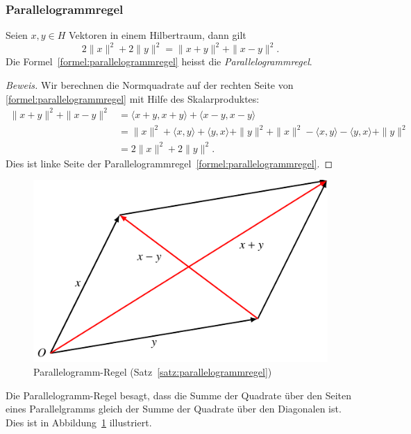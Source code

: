 \subsubsection{Parallelogrammregel}
\begin{satz}
\label{satz:parallelogrammregel}
Seien $x,y\in H$ Vektoren in einem Hilbertraum, dann gilt
\begin{equation}
2\|x\|^2 + 2\|y\|^2
=
\| x+y\|^2 + \|x-y\|^2.
\label{formel:parallelogrammregel}
\end{equation}
Die Formel~\eqref{formel:parallelogrammregel} heisst die
{\em Parallelogrammregel}.
\end{satz}

\begin{proof}[Beweis]
Wir berechnen die Normquadrate auf der rechten Seite von 
\eqref{formel:parallelogrammregel} mit Hilfe des Skalarproduktes:
\begin{align*}
\|x+y\|^2 + \|x-y\|^2
&=
\langle x+y,x+y\rangle + \langle x-y,x-y\rangle
\\
&=
\|x\|^2 + \langle x,y\rangle + \langle y,x\rangle + \|y\|^2
+
\|x\|^2 - \langle x,y\rangle - \langle y,x\rangle + \|y\|^2
\\
&=
2\|x\|^2 + 2\|y\|^2.
\end{align*}
Dies ist linke Seite der Parallelogrammregel~\eqref{formel:parallelogrammregel}.
\end{proof}

\begin{figure}
\centering
\includegraphics{chapters/1-geometrie/images/parallelogramm.pdf}
\caption{Parallelogramm-Regel (Satz~\ref{satz:parallelogrammregel})
\label{figure:parallelogrammregel}}
\end{figure}


Die Parallelogramm-Regel besagt, dass die Summe der Quadrate über den
Seiten eines Parallelgramms gleich der Summe der Quadrate über den
Diagonalen ist.
Dies ist in Abbildung~\ref{figure:parallelogrammregel} illustriert.

